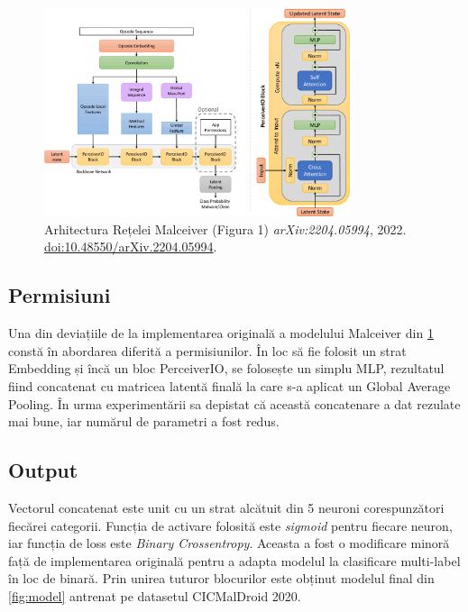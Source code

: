\documentclass[12pt,a4paper]{report}
\begin{document}
\begin{figure}[H]
      \centering
      \includegraphics[width=0.8\textwidth]{visuals/malceiver.png}
      \caption{Arhitectura Rețelei Malceiver\cite{mclaughlin2022malceiver} (Figura 1) \textit{arXiv:2204.05994}, 2022. \href{https://doi.org/10.48550/arXiv.2204.05994}{doi:10.48550/arXiv.2204.05994}.}
      \label{fig:malceiver}
\end{figure}

\subsection{Permisiuni}
Una din deviațiile de la implementarea originală a modelului Malceiver din \cref{fig:malceiver} constă în abordarea diferită a permisiunilor.
În loc să fie folosit un strat Embedding și încă un bloc PerceiverIO, se folosește un simplu MLP,
rezultatul fiind concatenat cu matricea latentă finală la care s-a aplicat un Global Average Pooling.
În urma experimentării sa depistat că această concatenare a dat rezulate mai bune,
iar numărul de parametri a fost redus.

\subsection{Output}
Vectorul concatenat este unit cu un strat alcătuit din 5 neuroni corespunzători fiecărei categorii.
Funcția de activare folosită este \textit{sigmoid} pentru fiecare neuron, iar funcția de loss este \textit{Binary Crossentropy}.
Aceasta a fost o modificare minoră față de implementarea originală pentru a adapta modelul la clasificare multi-label în loc de binară.
Prin unirea tuturor blocurilor este obținut modelul final din \cref{fig:model} antrenat pe datasetul CICMalDroid 2020\cite{cicmaldroid0,cicmaldroid1}.
\end{document}
